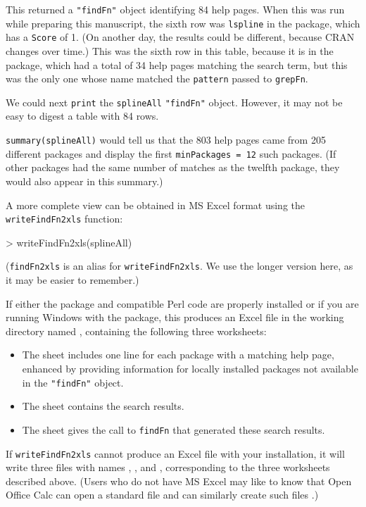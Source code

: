 \documentclass[a4paper]{report}
\begin{document}
\begin{article}
This returned a {\tt "findFn"} object identifying 84 help pages.
When this was
run while preparing this manuscript, the sixth row was
{\tt lspline} in the
 package, which has a {\tt Score} of 1.
(On another day, the results could be different, because
CRAN changes over time.)  This was the sixth row in this
table, because it is in the
 package, which had a total of 34 help
pages matching the search term, but this was the only
one whose name matched the {\tt pattern} passed to {\tt grepFn}.

We could next {\tt print} the {\tt splineAll} {\tt "findFn"}
object.  However, it may not be easy to digest a table
with 84 rows.

{\tt summary(splineAll)} would tell us that the 803  help pages
came from 205 different packages and display the first
{\tt minPackages = 12} such packages.
(If other packages had the same number of
matches as the twelfth package, they would also appear in this
summary.)

A more complete view can be obtained in MS Excel format
using the {\tt writeFindFn2xls} function:
\begin{Schunk}
\begin{Sinput}
> writeFindFn2xls(splineAll)
\end{Sinput}
\end{Schunk}
({\tt findFn2xls} is an alias for {\tt writeFindFn2xls}.
We use the longer version here, as it may be
easier to remember.)

If either the  package and compatible Perl code
are properly installed or if you are running Windows with
the  package, this produces an Excel file in the
working directory named , containing the
following three worksheets:

\begin{itemize}
\item{The  sheet includes one line for each
package with a matching help page, enhanced by providing
information for locally installed packages
not available in the {\tt "findFn"} object.}
\item{The  sheet contains the search results.}
\item{The  sheet gives the call to {\tt findFn}
that generated these search results.}
\end{itemize}

If {\tt writeFindFn2xls} cannot produce an Excel file with
your installation, it will write three  files with
names , , and
, corresponding to the three
worksheets described above. (Users who do not have MS Excel
may like to know that Open Office Calc can open a standard
 file and can similarly create such files
\citep{CALC09MAN}.)


\end{article}
\end{document}
